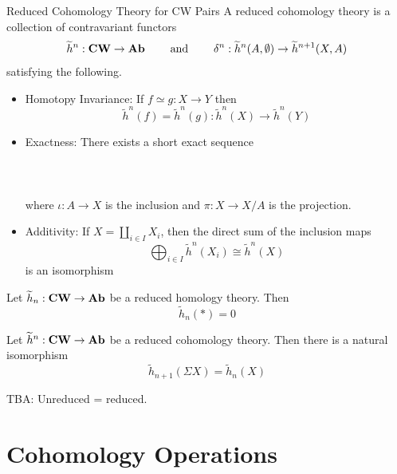 \documentclass[a4paper]{article}
\begin{document}
\begin{defn}{Reduced Cohomology Theory for CW Pairs}{} A reduced cohomology theory is a collection of contravariant functors $$\widetilde{h}^n:\bold{CW}\to\bold{Ab}\;\;\;\;\;\;\;\text{ and }\;\;\;\;\;\;\;\delta^n:\widetilde{h}^n(A,\emptyset)\to\widetilde{h}^{n+1}(X,A)$$ satisfying the following. 
\begin{itemize}
\item Homotopy Invariance: If $f\simeq g:X\to Y$ then $$\widetilde{h}^n(f)=\widetilde{h}^n(g):\widetilde{h}^n(X)\to\widetilde{h}^n(Y)$$
\item Exactness: There exists a short exact sequence \\~\\
\\~\\
where $\iota:A\to X$ is the inclusion and $\pi:X\to X/A$ is the projection. 
\item Additivity: If $X=\coprod_{i\in I}X_i$, then the direct sum of the inclusion maps $$\bigoplus_{i\in I}\widetilde{h}^n(X_i)\cong\widetilde{h}^n(X)$$ is an isomorphism
\end{itemize}
\end{defn}

\begin{lmm}{}{} Let $\widetilde{h}_n:\bold{CW}\to\bold{Ab}$ be a reduced homology theory. Then $$\widetilde{h}_n(\ast)=0$$
\end{lmm}

\begin{prp}{}{} Let $\widetilde{h}^n:\bold{CW}\to\bold{Ab}$ be a reduced cohomology theory. Then there is a natural isomorphism $$\widetilde{h}_{n+1}(\Sigma X)=\widetilde{h}_n(X)$$
\end{prp}

TBA: Unreduced = reduced. 

\pagebreak
\section{Cohomology Operations}
\end{document}

